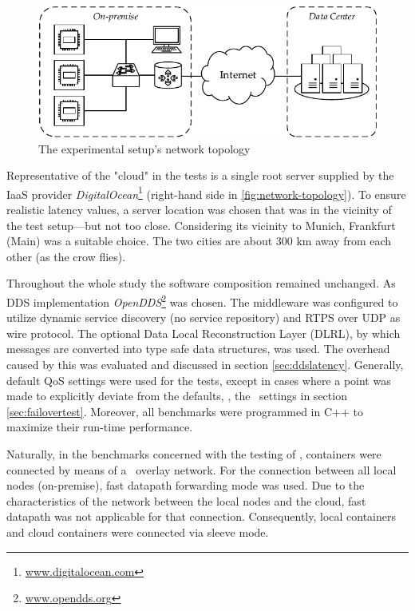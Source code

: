 \begin{figure}[htpb]
  \centering
  \includegraphics[width=\textwidth]{figures/network-setup}
  \caption[Network topology of the experimental setup]{The experimental setup's network topology}\label{fig:network-topology}
\end{figure}
%
Representative of the "cloud" in the tests is a single root server supplied by the IaaS provider \emph{DigitalOcean}\footnote{\url{www.digitalocean.com}} (right-hand side in \autoref{fig:network-topology}). To ensure realistic latency values, a server location was chosen that was in the vicinity of the test setup---but not too close. Considering its vicinity to Munich, Frankfurt (Main) was a suitable choice. The two cities are about 300 km away from each other (as the crow flies).

Throughout the whole study the software composition remained unchanged. As DDS implementation \emph{OpenDDS}\footnote{\url{www.opendds.org}} was chosen. The middleware was configured to utilize dynamic service discovery (no service repository) and RTPS over UDP as wire protocol. The optional Data Local Reconstruction Layer (DLRL), by which messages are converted into type safe data structures, was used. The overhead caused by this was evaluated and discussed in section \ref{sec:ddslatency}. Generally, default QoS settings were used for the tests, except in cases where a point was made to explicitly deviate from the defaults, \eg , the \liveliness\ settings in section \ref{sec:failovertest}. Moreover, all benchmarks were programmed in C++ to maximize their run-time performance.

Naturally, in the benchmarks concerned with the testing of \wnet  , containers were connected by means of a \wnet\ overlay network. For the connection between all local nodes (on-premise), fast datapath forwarding mode was used. Due to the characteristics of the network between the local nodes and the cloud, fast datapath was not applicable for that connection. Consequently, local containers and cloud containers were connected via sleeve mode.

